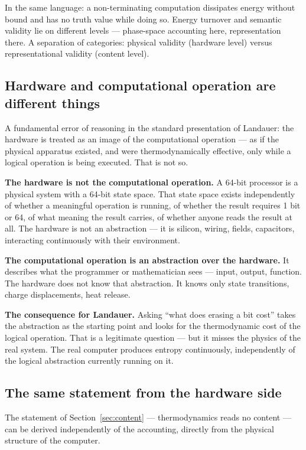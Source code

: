 In the same language: a non-terminating computation dissipates energy without
bound and has no truth value while doing so. Energy turnover and semantic validity
lie on different levels --- phase-space accounting here, representation there. A
separation of categories: physical validity (hardware level) versus
representational validity (content level).

\subsection{Hardware and computational operation are different things}

A fundamental error of reasoning in the standard presentation of Landauer: the
hardware is treated as an image of the computational operation --- as if the
physical apparatus existed, and were thermodynamically effective, only while a
logical operation is being executed. That is not so.

\LB \textbf{The hardware is not the computational operation.} A 64-bit processor
is a physical system with a 64-bit state space. That state space exists
independently of whether a meaningful operation is running, of whether the result
requires 1 bit or 64, of what meaning the result carries, of whether anyone reads
the result at all. The hardware is not an abstraction --- it is silicon, wiring,
fields, capacitors, interacting continuously with their environment.

\LB \textbf{The computational operation is an abstraction over the hardware.} It
describes what the programmer or mathematician sees --- input, output, function.
The hardware does not know that abstraction. It knows only state transitions,
charge displacements, heat release.

\textbf{The consequence for Landauer.} Asking “what does erasing a bit cost”
takes the abstraction as the starting point and looks for the thermodynamic cost
of the logical operation. That is a legitimate question --- but it misses the
physics of the real system. The real computer produces entropy continuously,
independently of the logical abstraction currently running on it.

\subsection{The same statement from the hardware side}

The statement of Section~\ref{sec:content} --- thermodynamics reads no content ---
can be derived independently of the accounting, directly from the physical
structure of the computer.

